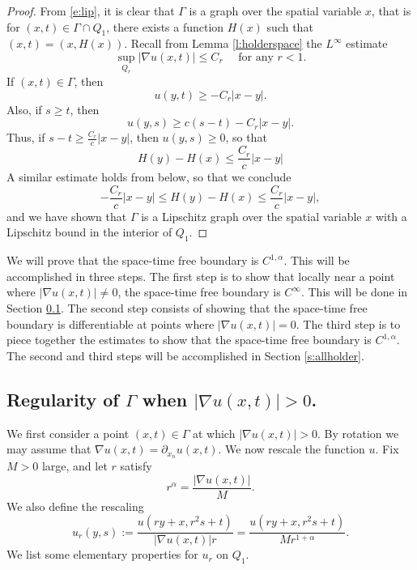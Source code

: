 \documentclass{amsart}
\numberwithin{equation}{section}
\begin{document}
 \begin{proof}
     From \eqref{e:lip}, it is clear that $\Gamma$ is a graph over the spatial variable $x$, that is for $(x,t) \in \Gamma\cap Q_1$, there exists a function $H(x)$ such that $(x,t)=(x,H(x))$. 
     Recall from Lemma \ref{l:holderspace} the $L^{\infty}$ estimate
     \[
      \sup_{Q_{r}} |\nabla u(x,t)|\leq C_r \quad \text{ for any } r<1. 
     \]
    If $(x,t) \in \Gamma$, then 
    \[
     u(y,t)\geq -C_r |x-y|. 
    \]
    Also, if $s\geq t$, then 
    \[
    u(y,s)\geq c(s-t)- C_r|x-y|. 
    \]
    Thus, if $s-t\geq \frac{C_r}{c}|x-y|$, then $u(y,s)\geq 0$, so that 
    \[
      H(y)-H(x)\leq \frac{C_r}{c}|x-y|
    \]
    A similar estimate holds from below, so that we conclude 
    \[
    -\frac{C_r}{c}|x-y| \leq H(y)-H(x)\leq \frac{C_r}{c}|x-y|,
    \]
    and we have shown that $\Gamma$ is a Lipschitz graph over the spatial variable $x$ with a Lipschitz bound in the interior of $Q_1$.  
 \end{proof}
 
 We will prove that the space-time free boundary is $C^{1,\alpha}$. This will be accomplished in three steps. The first step is to show that locally near a point where $|\nabla u(x,t)|\neq 0$, the space-time free boundary is $C^{\infty}$. This will be done in Section \ref{s:pos}. The second step consists of showing that the space-time free boundary is differentiable at points where $|\nabla u(x,t)|= 0$. The third step is to piece together the estimates to show that the space-time free boundary is $C^{1,\alpha}$. The second and third steps will be accomplished in Section \ref{s:allholder}. 


 \subsection{Regularity of $\Gamma$ when $|\nabla u(x,t)|>0$.} \label{s:pos}
 We first consider a point $(x,t) \in \Gamma$ at which $|\nabla u(x,t)|> 0$. By rotation we may assume that $\nabla u(x,t)=\partial_{x_n} u(x,t)$. We now rescale the function $u$. Fix $M>0$ large, and let $r$ satisfy
 \begin{equation} \label{e:r}
 r^{\alpha}=\frac{|\nabla u(x,t)|}{M}.
 \end{equation}
 We also define the rescaling
 \begin{equation} \label{e:ur}
 u_r(y,s):=\frac{u(ry+x,r^2s+t)}{|\nabla u(x,t)|r}=\frac{u(ry+x,r^2s+t)}{Mr^{1+\alpha}}. 
 \end{equation}
 We list some elementary properties for $u_r$ on $Q_1$. 
\end{document}
